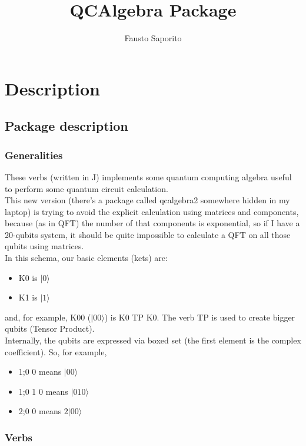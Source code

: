 \documentclass[a4paper,11pt]{amsbook}
\begin{document}
\title{QCAlgebra Package}
\author{Fausto Saporito}
\maketitle
\tableofcontents
\part{Description}

\chapter{Package description}

\section{Generalities}

These verbs (written in J) implements some quantum computing algebra useful to 
perform some quantum circuit calculation.\\
This new version (there's a package called qcalgebra2 somewhere hidden in my laptop) is trying to avoid the explicit calculation using matrices and components, because (as in QFT) the number  of that components is exponential, so if I have a 20-qubits system, it should be quite impossible to calculate a QFT on all those qubits using matrices.\\

In this schema, our basic elements (kets) are:
\begin{itemize}
\item K0 is $|0\rangle$ 
\item K1 is $|1\rangle$ 
\end{itemize}

and, for example, K00 ($|00\rangle$) is K0 TP K0. The verb TP is used to create bigger qubits (Tensor Product).\\
Internally, the qubits are expressed via boxed set (the first element is the complex coefficient). So, for example,

\begin{itemize}
\item 1;0 0 means $|00\rangle $
\item 1;0 1 0 means $|010\rangle $
\item 2;0 0 means $2|00\rangle $
\end{itemize}
\section{Verbs}
\end{document}
